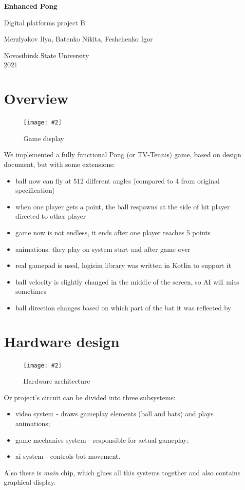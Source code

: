 \documentclass[12pt,a4paper]{article}
\let\oldsection\section
\renewcommand\section{\clearpage\oldsection}
\newcommand{\dofigure}[3][H]{
    \begin{figure}[#1]
        \centering
        \texttt{[image: \#2]}
        \caption{#3}
    \end{figure}
}
\newcommand{\chip}[1]{{\itshape#1}}
\begin{document}
    \begin{titlepage}
        \begin{center}
            \vspace*{0.3\textheight}

            {\Huge \textbf {Enhanced Pong}}

            {\LARGE Digital platforms project B}

            \vspace{1.5cm}
            Merzlyakov Ilya, Batenko Nikita, Feshchenko Igor

            \vfill
            Novosibirsk State University \\
            2021

        \end{center}
    \end{titlepage}
    \tableofcontents


    \section{Overview}
    \dofigure{main}{Game display}
    We implemented a fully functional Pong (or TV-Tennis) game, based on design document, but with some extensions:\begin{itemize}
        \item ball now can fly at 512 different angles (compared to 4 from original specification)
        \item when one player gets a point, the ball respawns at the side of hit player directed to other player
        \item game now is not endless, it ends after one player reaches 5 points
        \item animations: they play on system start and after game over 
        \item real gamepad is used, logisim library was written in Kotlin to support it
        \item ball velocity is slightly changed in the middle of the screen, so AI will miss sometimes
        \item ball direction changes based on which part of the bat it was reflected by
    \end{itemize}


    \section{Hardware design}
    \dofigure{scheme.png}{Hardware architecture}
    Or project's circuit can be divided into three subsystems:
    \begin{itemize}
        \item video system - draws gameplay elements (ball and bats) and plays animations;
        \item game mechanics system - responsible for actual gameplay;
        \item ai system - controls bot movement.
    \end{itemize}
    Also there is \chip{main} chip, which glues all this systems together and also contains graphical display.
\end{document}

